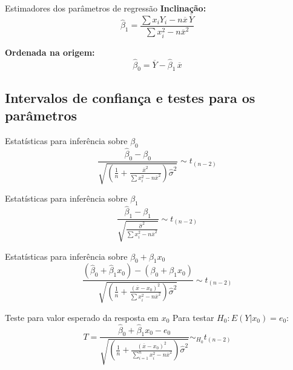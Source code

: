 \documentclass[a4paper,12pt]{article}
\begin{document}
\begin{formulabox}{Estimadores dos parâmetros de regressão}
\textbf{Inclinação:}
\begin{equation}\label{formula34}\tag{Fórmula 34}
    \hat{\beta}_1 = \frac{\sum x_i Y_i - n \overline{x} \, \overline{Y}}{\sum x_i^2 - n \overline{x}^2}
\end{equation}

\textbf{Ordenada na origem:}
\begin{equation}\label{formula35}\tag{Fórmula 35}
    \hat{\beta}_0 = \overline{Y} - \hat{\beta}_1 \, \overline{x}
\end{equation}
\end{formulabox}

\subsection{Intervalos de confiança e testes para os parâmetros}

\begin{formulabox}{Estatísticas para inferência sobre $\beta_0$}
\begin{equation}\label{formula36}\tag{Fórmula 36}
    \frac{\hat{\beta}_0 - \beta_0}{\sqrt{\left(\frac{1}{n} + \frac{\overline{x}^2}{\sum x_i^2 - n\overline{x}^2}\right)\hat{\sigma}^2}} \sim t_{(n-2)}
\end{equation}
\end{formulabox}

\begin{formulabox}{Estatísticas para inferência sobre $\beta_1$}
\begin{equation}\label{formula37}\tag{Fórmula 37}
    \frac{\hat{\beta}_1 - \beta_1}{\sqrt{\frac{\hat{\sigma}^2}{\sum x_i^2 - n\overline{x}^2}}} \sim t_{(n-2)}
\end{equation}
\end{formulabox}

\begin{formulabox}{Estatísticas para inferência sobre $\beta_0 + \beta_1 x_0$}
\begin{equation}\label{formula38}\tag{Fórmula 38}
    \frac{(\hat{\beta}_0 + \hat{\beta}_1 x_0) - (\beta_0 + \beta_1 x_0)}{\sqrt{\left(\frac{1}{n} + \frac{(\overline{x} - x_0)^2}{\sum x_i^2 - n\overline{x}^2}\right)\hat{\sigma}^2}} \sim t_{(n-2)}
\end{equation}
\end{formulabox}

\begin{formulabox}{Teste para valor esperado da resposta em $x_0$}
Para testar $H_0: E(Y|x_0) = e_0$:
\begin{equation}\label{formula39}\tag{Fórmula 39}
    T = \frac{\hat{\beta}_0 + \hat{\beta}_1 x_0 - e_0}{\sqrt{\left(\frac{1}{n} + \frac{(\overline{x} - x_0)^2}{\sum_{i=1}^n x_i^2 - n\overline{x}^2}\right)\hat{\sigma}^2}} \sim_{H_0} t_{(n-2)}
\end{equation}
\end{formulabox}
\end{document}
